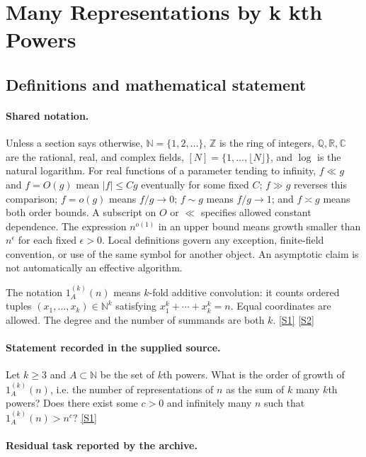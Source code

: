 \documentclass[11pt,a4paper]{article}
\newcommand{\N}{\mathbb{N}}
\newcommand{\Z}{\mathbb{Z}}
\newcommand{\Q}{\mathbb{Q}}
\newcommand{\R}{\mathbb{R}}
\newcommand{\C}{\mathbb{C}}
\newcommand{\sref}[2]{\hyperlink{source:#1:#2}{[S#2]}}
\begin{document}
\section{Many Representations by k kth Powers}\label{statement}


\subsection{Definitions and mathematical statement}

\paragraph{Shared notation.}Unless a section says otherwise, $\N=\{1,2,\ldots\}$,
$\Z$ is the ring of integers, $\Q,\R,\C$ are the rational, real, and complex
fields, $[N]=\{1,\ldots,\lfloor N\rfloor\}$, and $\log$ is the natural
logarithm. For real functions of a parameter tending to infinity,
$f\ll g$ and $f=O(g)$ mean $|f|\leq Cg$ eventually for some fixed $C$;
$f\gg g$ reverses this comparison; $f=o(g)$ means $f/g\to0$;
$f\sim g$ means $f/g\to1$; and $f\asymp g$ means both order bounds.
A subscript on $O$ or $\ll$ specifies allowed constant dependence.
The expression $n^{o(1)}$ in an upper bound means growth smaller than
$n^\epsilon$ for each fixed $\epsilon>0$. Local definitions govern any
exception, finite-field convention, or use of the same symbol for another
object. An asymptotic claim is not automatically an effective algorithm.



The notation $1_A^{(k)}(n)$ means $k$-fold additive convolution: it counts ordered tuples $(x_1,\ldots,x_k)\in\N^k$ satisfying $x_1^k+\cdots+x_k^k=n$. Equal coordinates are allowed. The degree and the number of summands are both $k$. \sref{statement}{1} \sref{statement}{2}

\paragraph{Statement recorded in the supplied source.}
Let $k\geq 3$ and $A\subset \mathbb{N}$ be the set of $k$th powers. What is the order of growth of $1_A^{(k)}(n)$, i.e. the number of representations of $n$ as the sum of $k$ many $k$th powers? Does there exist some $c>0$ and infinitely many $n$ such that $ 1_A^{(k)}(n) >n^c? $ \sref{statement}{1}

\paragraph{Residual task reported by the archive.}
\end{document}
